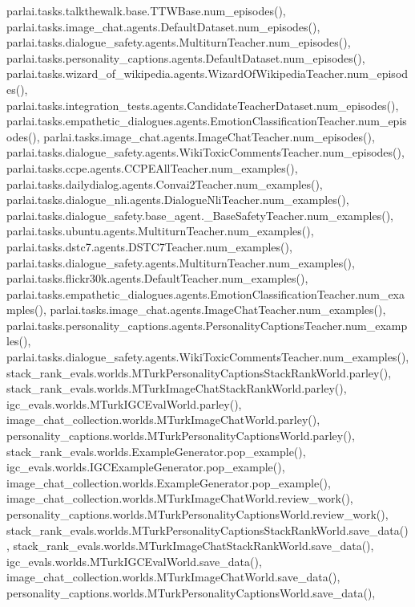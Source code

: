 parlai.\+tasks.\+talkthewalk.\+base.\+T\+T\+W\+Base.\+num\+\_\+episodes(), parlai.\+tasks.\+image\+\_\+chat.\+agents.\+Default\+Dataset.\+num\+\_\+episodes(), parlai.\+tasks.\+dialogue\+\_\+safety.\+agents.\+Multiturn\+Teacher.\+num\+\_\+episodes(), parlai.\+tasks.\+personality\+\_\+captions.\+agents.\+Default\+Dataset.\+num\+\_\+episodes(), parlai.\+tasks.\+wizard\+\_\+of\+\_\+wikipedia.\+agents.\+Wizard\+Of\+Wikipedia\+Teacher.\+num\+\_\+episodes(), parlai.\+tasks.\+integration\+\_\+tests.\+agents.\+Candidate\+Teacher\+Dataset.\+num\+\_\+episodes(), parlai.\+tasks.\+empathetic\+\_\+dialogues.\+agents.\+Emotion\+Classification\+Teacher.\+num\+\_\+episodes(), parlai.\+tasks.\+image\+\_\+chat.\+agents.\+Image\+Chat\+Teacher.\+num\+\_\+episodes(), parlai.\+tasks.\+dialogue\+\_\+safety.\+agents.\+Wiki\+Toxic\+Comments\+Teacher.\+num\+\_\+episodes(), parlai.\+tasks.\+ccpe.\+agents.\+C\+C\+P\+E\+All\+Teacher.\+num\+\_\+examples(), parlai.\+tasks.\+dailydialog.\+agents.\+Convai2\+Teacher.\+num\+\_\+examples(), parlai.\+tasks.\+dialogue\+\_\+nli.\+agents.\+Dialogue\+Nli\+Teacher.\+num\+\_\+examples(), parlai.\+tasks.\+dialogue\+\_\+safety.\+base\+\_\+agent.\+\_\+\+Base\+Safety\+Teacher.\+num\+\_\+examples(), parlai.\+tasks.\+ubuntu.\+agents.\+Multiturn\+Teacher.\+num\+\_\+examples(), parlai.\+tasks.\+dstc7.\+agents.\+D\+S\+T\+C7\+Teacher.\+num\+\_\+examples(), parlai.\+tasks.\+dialogue\+\_\+safety.\+agents.\+Multiturn\+Teacher.\+num\+\_\+examples(), parlai.\+tasks.\+flickr30k.\+agents.\+Default\+Teacher.\+num\+\_\+examples(), parlai.\+tasks.\+empathetic\+\_\+dialogues.\+agents.\+Emotion\+Classification\+Teacher.\+num\+\_\+examples(), parlai.\+tasks.\+image\+\_\+chat.\+agents.\+Image\+Chat\+Teacher.\+num\+\_\+examples(), parlai.\+tasks.\+personality\+\_\+captions.\+agents.\+Personality\+Captions\+Teacher.\+num\+\_\+examples(), parlai.\+tasks.\+dialogue\+\_\+safety.\+agents.\+Wiki\+Toxic\+Comments\+Teacher.\+num\+\_\+examples(), stack\+\_\+rank\+\_\+evals.\+worlds.\+M\+Turk\+Personality\+Captions\+Stack\+Rank\+World.\+parley(), stack\+\_\+rank\+\_\+evals.\+worlds.\+M\+Turk\+Image\+Chat\+Stack\+Rank\+World.\+parley(), igc\+\_\+evals.\+worlds.\+M\+Turk\+I\+G\+C\+Eval\+World.\+parley(), image\+\_\+chat\+\_\+collection.\+worlds.\+M\+Turk\+Image\+Chat\+World.\+parley(), personality\+\_\+captions.\+worlds.\+M\+Turk\+Personality\+Captions\+World.\+parley(), stack\+\_\+rank\+\_\+evals.\+worlds.\+Example\+Generator.\+pop\+\_\+example(), igc\+\_\+evals.\+worlds.\+I\+G\+C\+Example\+Generator.\+pop\+\_\+example(), image\+\_\+chat\+\_\+collection.\+worlds.\+Example\+Generator.\+pop\+\_\+example(), image\+\_\+chat\+\_\+collection.\+worlds.\+M\+Turk\+Image\+Chat\+World.\+review\+\_\+work(), personality\+\_\+captions.\+worlds.\+M\+Turk\+Personality\+Captions\+World.\+review\+\_\+work(), stack\+\_\+rank\+\_\+evals.\+worlds.\+M\+Turk\+Personality\+Captions\+Stack\+Rank\+World.\+save\+\_\+data(), stack\+\_\+rank\+\_\+evals.\+worlds.\+M\+Turk\+Image\+Chat\+Stack\+Rank\+World.\+save\+\_\+data(), igc\+\_\+evals.\+worlds.\+M\+Turk\+I\+G\+C\+Eval\+World.\+save\+\_\+data(), image\+\_\+chat\+\_\+collection.\+worlds.\+M\+Turk\+Image\+Chat\+World.\+save\+\_\+data(), personality\+\_\+captions.\+worlds.\+M\+Turk\+Personality\+Captions\+World.\+save\+\_\+data(), 